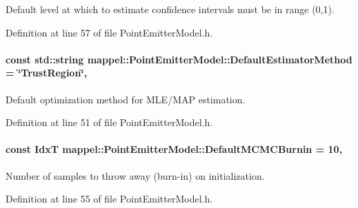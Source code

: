 Default level at which to estimate confidence intervals must be in range (0,1). 



Definition at line 57 of file Point\+Emitter\+Model.\+h.

\paragraph[{\texorpdfstring{Default\+Estimator\+Method}{DefaultEstimatorMethod}}]{\setlength{\rightskip}{0pt plus 5cm}const std\+::string mappel\+::\+Point\+Emitter\+Model\+::\+Default\+Estimator\+Method = \char`\"{}Trust\+Region\char`\"{}\hspace{0.3cm}{\ttfamily [static]}, {\ttfamily [inherited]}}\hypertarget{classmappel_1_1PointEmitterModel_aa90f02cfd2af6acf4d8ba3bbfbe906e5}{}\label{classmappel_1_1PointEmitterModel_aa90f02cfd2af6acf4d8ba3bbfbe906e5}


Default optimization method for M\+L\+E/\+M\+AP estimation. 



Definition at line 51 of file Point\+Emitter\+Model.\+h.

\paragraph[{\texorpdfstring{Default\+M\+C\+M\+C\+Burnin}{DefaultMCMCBurnin}}]{\setlength{\rightskip}{0pt plus 5cm}const {\bf IdxT} mappel\+::\+Point\+Emitter\+Model\+::\+Default\+M\+C\+M\+C\+Burnin = 10\hspace{0.3cm}{\ttfamily [static]}, {\ttfamily [inherited]}}\hypertarget{classmappel_1_1PointEmitterModel_a6fc96e398771a33d5586c2af10a2e6d8}{}\label{classmappel_1_1PointEmitterModel_a6fc96e398771a33d5586c2af10a2e6d8}


Number of samples to throw away (burn-\/in) on initialization. 



Definition at line 55 of file Point\+Emitter\+Model.\+h.

